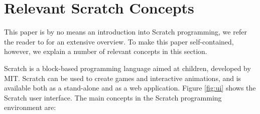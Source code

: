 \documentclass[preprint]{sigplanconf}
\begin{document}
\section{Relevant Scratch Concepts}
\label{sec:scratch}
This paper is by no means an introduction into Scratch programming, we refer the reader to \cite{brennan_creative_2014} for an extensive overview. To make this paper self-contained, however, we explain a number of relevant concepts in this section. 

Scratch is a block-based programming language aimed at children, developed by MIT. Scratch can be used to create games and interactive animations, and is available both as a stand-alone and as a web application. Figure \ref{fig:ui} shows the Scratch user interface. The main concepts in the Scratch programming environment are:
\end{document}
